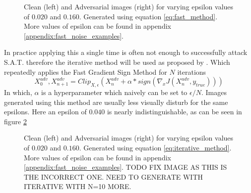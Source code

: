 \begin{figure}[H]
{        %
    }
    \caption{Clean (left) and Adversarial images (right) for varying epsilon values of $0.020$ and $0.160$. Generated using equation \ref{eq:fast_method}. More values of epsilon can be found in appendix \ref{appendix:fast_noise_examples}.}
    \label{fig:fast_noise_examples}
\end{figure}

In practice applying this a single time is often not enough to successfully attack S.A.T. therefore the iterative method will be used as proposed by \citeauthor{Kurakin}. Which repeatedly applies the Fast Gradient Sign Method for $N$ iterations
\begin{equation}
    X^{adv}_{0}, X^{adv}_{n + 1} = Clip_{X, \epsilon}(X^{adv}_{n} + \alpha * sign(\nabla_{x}J(X^{adv}_{n}, y_{true})))
    \label{eq:iterative_method}
\end{equation}
In which, $\alpha$ is a hyperparameter which naively can be set to $\epsilon / N$. Images generated using this method are usually less visually disturb for the same epsilons. Here an epsilon of $0.040$ is nearly indistinguishable, as can be seen in figure \ref{fig:iterative_noise_examples}

\begin{figure}[H]
    \centering
    \vspace{\floatsep}
    \caption{Clean (left) and Adversarial images (right) for varying epsilon values of $0.020$ and $0.160$. Generated using equation \ref{eq:iterative_method}. More values of epsilon can be found in appendix \ref{appendix:fast_noise_examples}. TODO FIX IMAGE AS THIS IS THE INCORRECT ONE. NEED TO GENERATE WITH ITERATIVE WITH N=10 MORE.}
    \label{fig:iterative_noise_examples}
\end{figure}



